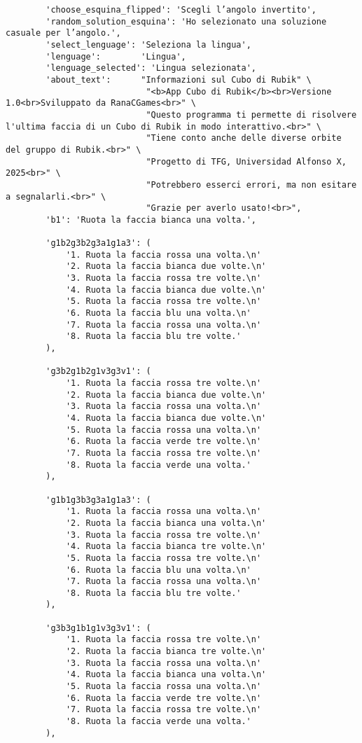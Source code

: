 \begin{lstlisting}
        'choose_esquina_flipped': 'Scegli l’angolo invertito',
        'random_solution_esquina': 'Ho selezionato una soluzione casuale per l’angolo.',
        'select_lenguage': 'Seleziona la lingua',
        'lenguage':        'Lingua',
        'lenguage_selected': 'Lingua selezionata',
        'about_text':      "Informazioni sul Cubo di Rubik" \
                            "<b>App Cubo di Rubik</b><br>Versione 1.0<br>Sviluppato da RanaCGames<br>" \
                            "Questo programma ti permette di risolvere l'ultima faccia di un Cubo di Rubik in modo interattivo.<br>" \
                            "Tiene conto anche delle diverse orbite del gruppo di Rubik.<br>" \
                            "Progetto di TFG, Universidad Alfonso X, 2025<br>" \
                            "Potrebbero esserci errori, ma non esitare a segnalarli.<br>" \
                            "Grazie per averlo usato!<br>",
        'b1': 'Ruota la faccia bianca una volta.',
        
        'g1b2g3b2g3a1g1a3': (
            '1. Ruota la faccia rossa una volta.\n'
            '2. Ruota la faccia bianca due volte.\n'
            '3. Ruota la faccia rossa tre volte.\n'
            '4. Ruota la faccia bianca due volte.\n'
            '5. Ruota la faccia rossa tre volte.\n'
            '6. Ruota la faccia blu una volta.\n'
            '7. Ruota la faccia rossa una volta.\n'
            '8. Ruota la faccia blu tre volte.'
        ),
        
        'g3b2g1b2g1v3g3v1': (
            '1. Ruota la faccia rossa tre volte.\n'
            '2. Ruota la faccia bianca due volte.\n'
            '3. Ruota la faccia rossa una volta.\n'
            '4. Ruota la faccia bianca due volte.\n'
            '5. Ruota la faccia rossa una volta.\n'
            '6. Ruota la faccia verde tre volte.\n'
            '7. Ruota la faccia rossa tre volte.\n'
            '8. Ruota la faccia verde una volta.'
        ),
        
        'g1b1g3b3g3a1g1a3': (
            '1. Ruota la faccia rossa una volta.\n'
            '2. Ruota la faccia bianca una volta.\n'
            '3. Ruota la faccia rossa tre volte.\n'
            '4. Ruota la faccia bianca tre volte.\n'
            '5. Ruota la faccia rossa tre volte.\n'
            '6. Ruota la faccia blu una volta.\n'
            '7. Ruota la faccia rossa una volta.\n'
            '8. Ruota la faccia blu tre volte.'
        ),
        
        'g3b3g1b1g1v3g3v1': (
            '1. Ruota la faccia rossa tre volte.\n'
            '2. Ruota la faccia bianca tre volte.\n'
            '3. Ruota la faccia rossa una volta.\n'
            '4. Ruota la faccia bianca una volta.\n'
            '5. Ruota la faccia rossa una volta.\n'
            '6. Ruota la faccia verde tre volte.\n'
            '7. Ruota la faccia rossa tre volte.\n'
            '8. Ruota la faccia verde una volta.'
        ),
        

\end{lstlisting}
